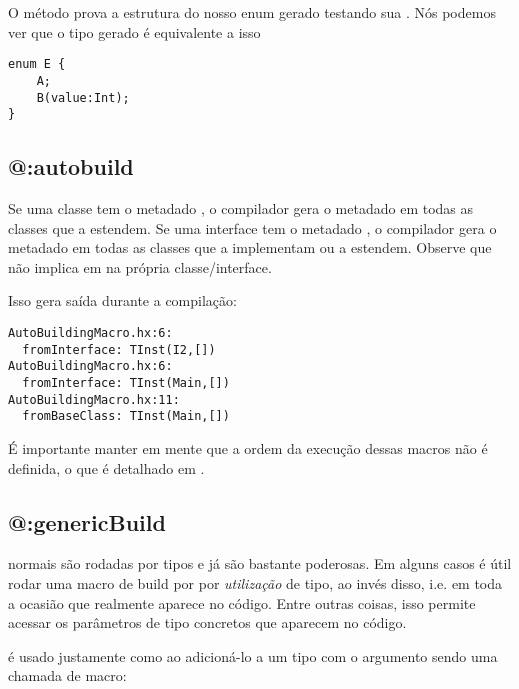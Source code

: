 \begin{itemize}
\begin{itemize}
O método  prova a estrutura do nosso enum gerado testando sua . Nós podemos ver que o tipo gerado é equivalente a isso

\begin{lstlisting}
enum E {
    A;
    B(value:Int);
}
\end{lstlisting}



\subsection{@:autobuild}
\label{macro-auto-build}

Se uma classe tem o metadado , o compilador gera o metadado  em todas as classes que a estendem. Se uma interface tem o metadado , o compilador gera o metadado  em todas as classes que a implementam ou a estendem. Observe que  não implica em  na própria classe/interface.


Isso gera saída durante a compilação:

\begin{lstlisting}
AutoBuildingMacro.hx:6:
  fromInterface: TInst(I2,[])
AutoBuildingMacro.hx:6:
  fromInterface: TInst(Main,[])
AutoBuildingMacro.hx:11:
  fromBaseClass: TInst(Main,[])
\end{lstlisting}

É importante manter em mente que a ordem da execução dessas macros não é definida, o que é detalhado em .



\subsection{@:genericBuild}
\label{macro-generic-build}

 normais são rodadas por tipos e já são bastante poderosas. Em alguns casos é útil rodar uma macro de build por por \emph{utilização} de tipo, ao invés disso, i.e. em toda a ocasião que realmente aparece no código. Entre outras coisas, isso permite acessar os parâmetros de tipo concretos que aparecem no código.

 é usado justamente como  ao adicioná-lo a um tipo com o argumento sendo uma chamada de macro:


\end{itemize}
\end{itemize}
